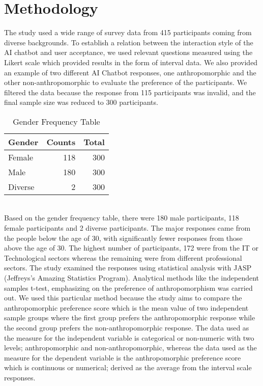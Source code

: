 \documentclass[conference]{IEEEtran}
\begin{document}
\section{Methodology}
The study used a wide range of survey data from 415 participants coming from diverse backgrounds. To establish a relation between the interaction style of the AI chatbot and user acceptance, we used relevant questions measured using the Likert scale which provided results in the form of interval data. We also provided an example of two different AI Chatbot responses, one anthropomorphic and the other non-anthropomorphic to evaluate the preference of the participants. We filtered the data because the response from 115 participants was invalid, and the final sample size was reduced to 300 participants.   
\begin{table}[ht]
    \centering
    \caption{Gender Frequency Table}
    \label{tab:binomialTest}
    \begin{tabular}{lrr}
        \toprule
        \textbf{Gender} & \textbf{Counts} & \textbf{Total} \\
        \midrule
        Female & 118 & 300 \\
        Male & 180 & 300 \\
        Diverse & 2 & 300 \\
        \bottomrule
    \end{tabular}
\end{table}
\\
Based on the gender frequency table, there were 180 male participants, 118 female participants and 2 diverse participants. The major responses came from the people below the age of 30, with significantly fewer responses from those above the age of 30. The highest number of participants, 172 were from the IT or Technological sectors whereas the remaining were from different professional sectors.        
The study examined the responses using statistical analysis with JASP (Jeffreys's Amazing Statistics Program). Analytical methods like the independent samples t-test, emphasizing on the preference of anthropomorphism was carried out. We used this particular method because the study aims to compare the anthropomorphic preference score which is the mean value of two independent sample groups where the first group prefers the anthropomorphic response while the second group prefers the non-anthropomorphic response. The data used as the measure for the independent variable is categorical or non-numeric with two levels; anthropomorphic and non-anthropomorphic, whereas the data used as the measure for the dependent variable is the anthropomorphic preference score which is continuous or numerical; derived as the average from the interval scale responses.
\end{document}
